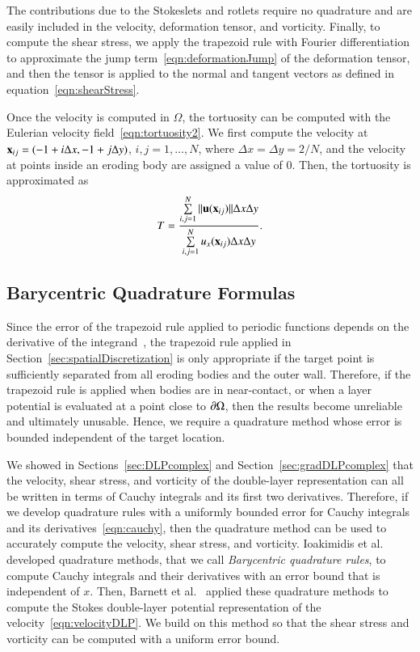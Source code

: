 \documentclass[preprint, 10pt]{elsarticle}
\begin{document}
The contributions due to the Stokeslets and rotlets require no
quadrature and are easily included in the velocity, deformation tensor,
and vorticity.  Finally, to compute the shear stress, we apply the
trapezoid rule with Fourier differentiation to approximate the jump
term~\eqref{eqn:deformationJump} of the deformation tensor, and then the
tensor is applied to the normal and tangent vectors as defined in
equation~\eqref{eqn:shearStress}.

Once the velocity is computed in $\Omega$, the tortuosity can be
computed with the Eulerian velocity field~\eqref{eqn:tortuosity2}.  We
first compute the velocity at ${\mathbf{x}}_{ij} = (-1 + i\Delta x, -1 + j\Delta
y)$, $i,j=1,\ldots,N$, where $\Delta x = \Delta y = 2/N$, and the
velocity at points inside an eroding body are assigned a value of 0.
Then, the tortuosity is approximated as
\begin{align}
  T = \frac{\sum\limits_{i,j=1}^N \|{\mathbf{u}}({\mathbf{x}}_{ij})\|\Delta x \Delta y}
      {\sum\limits_{i,j=1}^N u_x({\mathbf{x}}_{ij}) \Delta x \Delta y}.
\end{align}

\subsection{Barycentric Quadrature Formulas}
\label{sec:bary}
Since the error of the trapezoid rule applied to periodic functions
depends on the derivative of the integrand~\cite{tre-wei2014}, the
trapezoid rule applied in Section~\ref{sec:spatialDiscretization} is
only appropriate if the target point is sufficiently separated from all
eroding bodies and the outer wall.  Therefore, if the trapezoid rule is
applied when bodies are in near-contact, or when a layer potential is
evaluated at a point close to ${\partial}\Omega$, then the results become
unreliable and ultimately unusable.  Hence, we require a quadrature
method whose error is bounded independent of the target location.

We showed in Sections~\ref{sec:DLPcomplex} and
Section~\ref{sec:gradDLPcomplex} that the velocity, shear stress, and
vorticity of the double-layer representation can all be written in terms
of Cauchy integrals and its first two derivatives.  Therefore, if we
develop quadrature rules with a uniformly bounded error for Cauchy
integrals and its derivatives~\eqref{eqn:cauchy}, then the quadrature
method can be used to accurately compute the velocity, shear stress, and
vorticity.  Ioakimidis et al.~\cite{ioa-pap-per1991} developed
quadrature methods, that we call {\em Barycentric quadrature rules}, to
compute Cauchy integrals and their derivatives with an error bound that
is independent of $x$.  Then, Barnett et al.~\cite{bar-wu-vee2015}
applied these quadrature methods to compute the Stokes double-layer
potential representation of the velocity~\eqref{eqn:velocityDLP}.  We
build on this method so that the shear stress and vorticity can be
computed with a uniform error bound.
\end{document}
